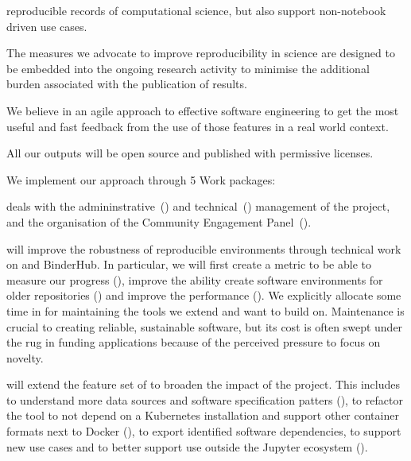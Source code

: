 \begin{compactenum}
  reproducible records of computational science, but also support non-notebook
  driven use cases.
\item The measures we advocate to improve reproducibility in science are
  designed to be embedded into the ongoing research activity to minimise the
  additional burden associated with the publication of results.
\item We believe in an agile approach to effective software engineering to get
  the most useful and fast feedback from the use of those features in a real
  world context.
\item All our outputs will be open source and published with permissive
  licenses.
\end{compactenum}


\medskip
\noindent We implement our approach through 5 Work packages:

{} deals with the admininstrative~()
and technical~() management of the
project, and the organisation of the Community Engagement
Panel~().

     will improve the robustness of reproducible
    environments through technical work on \repotodocker{} and BinderHub. In
    particular, we will first create a metric to be able to measure our progress
    (), improve the ability create
    software environments for older repositories
    () and improve the
    performance (). We
    explicitly allocate some time in  for
    maintaining the tools we extend and want to build on. Maintenance is crucial
    to creating reliable, sustainable software, but its cost is often swept
    under the rug in funding applications because of the perceived pressure to
    focus on novelty.

     will extend the feature set of \repotodocker{} to broaden
    the impact of the project. This
    includes to understand more data sources and software specification patters
    (), to refactor the tool to not depend on a
    Kubernetes installation and support other container formats next to Docker
    (), to export identified software dependencies,
    to support new use cases and to
    better support use outside the Jupyter ecosystem ().

